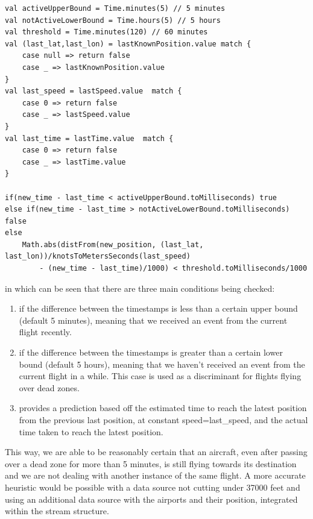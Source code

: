 \begin{verbatim}
val activeUpperBound = Time.minutes(5) // 5 minutes
val notActiveLowerBound = Time.hours(5) // 5 hours
val threshold = Time.minutes(120) // 60 minutes
val (last_lat,last_lon) = lastKnownPosition.value match {
    case null => return false
    case _ => lastKnownPosition.value
}
val last_speed = lastSpeed.value  match {
    case 0 => return false
    case _ => lastSpeed.value
}
val last_time = lastTime.value  match {
    case 0 => return false
    case _ => lastTime.value
}

if(new_time - last_time < activeUpperBound.toMilliseconds) true
else if(new_time - last_time > notActiveLowerBound.toMilliseconds) false
else
    Math.abs(distFrom(new_position, (last_lat, last_lon))/knotsToMetersSeconds(last_speed)
        - (new_time - last_time)/1000) < threshold.toMilliseconds/1000

\end{verbatim}

in which can be seen that there are three main conditions being checked:
\begin{enumerate}
    \item if the difference between the timestamps is less than a certain upper bound (default 5 minutes), meaning that we received an event from the current flight recently.
    \item if the difference between the timestamps is greater than a certain lower bound (default 5 hours), meaning that we haven't received an event from the current flight in a while. This case is used as a discriminant for flights flying over dead zones.
    \item provides a prediction based off the estimated time to reach the latest position from the previous last position, at constant speed=last\_speed, and the actual time taken to reach the latest position.
\end{enumerate}

This way, we are able to be reasonably certain that an aircraft, even after passing over a dead zone for more than 5 minutes, is still flying towards its destination and we are not dealing with another instance of the same flight. A more accurate heuristic would be possible with a data source not cutting under 37000 feet and using an additional data source with the airports and their position, integrated within the stream structure.

